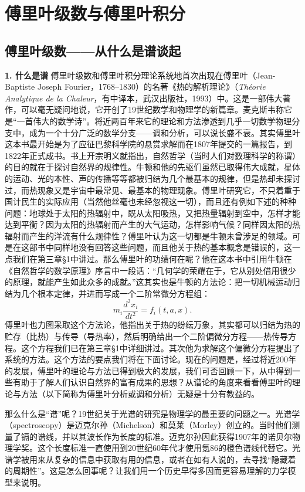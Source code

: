 \chapter{傅里叶级数与傅里叶积分}
\section{傅里叶级数——从什么是谱谈起}

\noindent\textbf{1. 什么是谱}\quad
傅里叶级数和傅里叶积分理论系统地首次出现在傅里叶（Jean-Baptiste Joseph Fourier，1768--1830）的名著《热的解析理论》（\textit{Théorie Analytique de la Chaleur}，有中译本，武汉出版社，1993）中。这是一部伟大著作，可以毫无疑问地说，它开创了19世纪数学和物理学的新篇章。麦克斯韦称它是“一首伟大的数学诗”。将近两百年来它的理论和方法渗透到几乎一切数学物理分支中，成为一个十分广泛的数学分支——调和分析，可以说长盛不衰。其实傅里叶这本书最开始是为了应征巴黎科学院的悬赏求解而在1807年提交的一篇报告，到1822年正式成书。书上开宗明义就指出，自然哲学（当时人们对数理科学的称谓）的目的就在于探讨自然界的规律性。牛顿和他的先驱们虽然已取得伟大成就，星体的运动、光的本性、声的传播等等都被归结为几个最基本的规律，但是热却未探讨过，而热现象又是宇宙中最常见、最基本的物理现象。傅里叶研究它，不只着重于国计民生的实际应用（当然他丝毫也未经忽视这一切），而且还有例如下述的种种问题：地球处于太阳的热辐射中，既从太阳吸热，又把热量辐射到空中，怎样才能达到平衡？因为太阳的热辐射而产生的大气运动，怎样影响气候？同样因太阳的热辐射而产生的洋流有什么规律性？傅里叶认为这一切都是牛顿未曾涉足的领域。可是在这部书中同样地没有回答这些问题，而且他关于热的基本概念是错误的，这一点我们在第三章\S1中讲过。那么傅里叶的功绩何在呢？他在这本书中引用牛顿在《自然哲学的数学原理》序言中一段话：“几何学的荣耀在于，它从别处借用很少的原理，就能产生如此众多的成就。”这其实也是牛顿的方法论：把一切机械运动归结为几个根本定律，并进而写成一个二阶常微分方程组：
\[
 m_i\frac{d^2x_i}{dt^2}=f_i(t,a,x).
\]
傅里叶也力图采取这个方法论，他指出关于热的纷纭万象，其实都可以归结为热的贮存（比热）与传导（导热率），然后明确给出一个二阶偏微分方程——热传导方程。这个方程我们已在第三章\S1中详细讲过。其次他为求解这个偏微分方程提出了系统的方法。这个方法的要点我们将在下面讨论。现在的问题是，经过将近200年的发展，傅里叶的理论与方法已得到极大的发展，我们可否回顾一下，从中得到一些有助于了解人们认识自然界的富有成果的思想？从谱论的角度来看看傅里叶的理论与方法（以下简称为傅里叶分析或调和分析）无疑是十分有教益的。

那么什么是“谱”呢？19世纪关于光谱的研究是物理学的最重要的问题之一。光谱学（spectroscopy）是迈克尔孙（Michelson）和莫莱（Morley）创立的。当时他们测量了镉的谱线，并以其波长作为长度的标准。迈克尔孙因此获得1907年的诺贝尔物理学奖。这个长度标准一直使用到20世纪60年代才使用氪86的橙色谱线代替它。光谱学被用来从复杂的信息中获取有用的信息，或者在如有人说的，去寻找“隐藏着的周期性”。这是怎么回事呢？让我们用一个历史早得多因而更容易理解的力学模型来说明。

